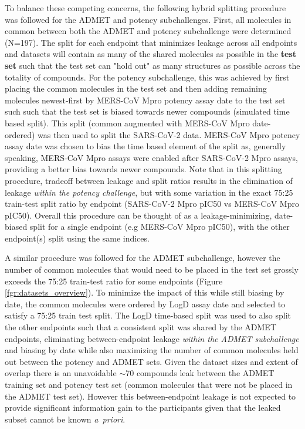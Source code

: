 \documentclass[journal=jcim,manuscript=article]{achemso}
\begin{document}
{To balance these competing concerns, the following hybrid splitting procedure was followed for the ADMET and potency subchallenges. First, all molecules in common between both the ADMET and potency subchallenge were determined (N=197). The split for each endpoint that minimizes leakage across all endpoints and datasets will contain as many of the shared molecules as possible in the \textbf{test set} such that the test set can "hold out" as many structures as possible across the totality of compounds. For the potency subchallenge, this was achieved by first placing the common molecules in the test set and then adding remaining molecules newest-first by MERS-CoV Mpro potency assay date to the test set such such that the test set is biased towards newer compounds (simulated time based split). This split (common augmented with MERS-CoV Mpro date-ordered) was then used to split the SARS-CoV-2 data. MERS-CoV Mpro potency assay date was chosen to bias the time based element of the split as, generally speaking, MERS-CoV Mpro assays were enabled after SARS-CoV-2 Mpro assays, providing a better bias towards newer compounds. Note that in this splitting procedure, tradeoff between leakage and split ratios results in the elimination of leakage \textit{within the potency challenge}, but with some variation in the exact 75:25 train-test split ratio by endpoint (SARS-CoV-2 Mpro pIC50 vs MERS-CoV Mpro pIC50). Overall this procedure can be thought of as a leakage-minimizing, date-biased split for a single endpoint (e.g MERS-CoV Mpro pIC50), with the other endpoint(s) split using the same indices.

A similar procedure was followed for the ADMET subchallenge, however the number of common molecules that would need to be placed in the test set grossly exceeds the 75:25 train-test ratio for some endpoints (Figure \ref{fgr:datasets_overview}). To minimize the impact of this while still biasing by date, the common molecules were ordered by LogD assay date and selected to satisfy a 75:25 train test split. The LogD time-based split was used to also split the other endpoints such that a consistent split was shared by the ADMET endpoints, eliminating between-endpoint leakage \textit{within the ADMET subchallenge} and biasing by date while also maximizing the number of common molecules held out between the potency and ADMET sets. Given the dataset sizes and extent of overlap there is an unavoidable $\sim$70 compounds leak between the ADMET training set and potency test set (common molecules that were not be placed in the ADMET test set). However this between-endpoint leakage is not expected to provide significant information gain to the participants given that the leaked subset cannot be known \textit{a~priori}.

}
\end{document}
